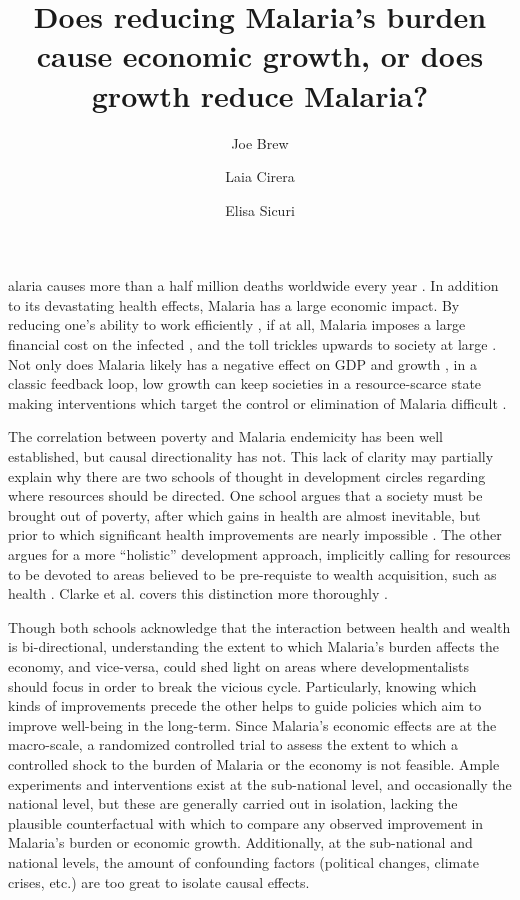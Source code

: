 \documentclass[9pt,twocolumn,twoside,lineno]{pnas-new}
\title{Does reducing Malaria's burden cause economic growth, or does growth reduce Malaria?}
\author[a,b,1]{Joe Brew}
\author[a]{Laia Cirera}
\author[a,c]{Elisa Sicuri}
\affil[a]{Barcelona Institute for Global Health: c/ Rosselló, 132, 5è 2a. 08036, Barcelona, Catalonia}
\affil[b]{VU University Amsterdam: De Boelelaan 1105, 1081 HV Amsterdam, Netherlands}
\affil[c]{Imperial College London: South Kensington Campus, London SW7 2AZ, U.K., UK}
\begin{document}
\maketitle
\thispagestyle{firststyle}


alaria causes more than a half million deaths worldwide every year \cite{White}. In addition to its devastating health effects, Malaria has a large economic impact.  By reducing one’s ability to work efficiently \cite{Nonvignon2016-vt}, if at all, Malaria imposes a large financial cost on the infected \cite{Asenso-Okyere1997-wj} \cite{Ajani2010-dd}, and the toll trickles upwards to society at large \cite{Sachs2002-ig}. Not only does Malaria likely has a negative effect on GDP and growth \cite{McCarthy2000-wl, Orem2012-kr, Hong2011-sa, Sachs2002-ig}, in a classic feedback loop, low growth can keep societies in a resource-scarce state making interventions which target the control or elimination of Malaria difficult \cite{White, Purdy2013-rt, Howard2017-pk, Phillips1998-ky}. 

The correlation between poverty and Malaria endemicity has been well established, but causal directionality has not. This lack of clarity may partially explain why there are two schools of thought in development circles regarding where resources should be directed. One school argues that a society must be brought out of poverty, after which gains in health are almost inevitable, but prior to which significant health improvements are nearly impossible \cite{Musgrove1996-hm}.  The other argues for a more “holistic” development approach, implicitly calling for resources to be devoted to areas believed to be pre-requiste to wealth acquisition, such as health \cite{Storm2008-dd, Sen_undated-gp}.  Clarke et al. covers this distinction more thoroughly \cite{Clarke_JA2016-ik}.

Though both schools acknowledge that the interaction between health and wealth is bi-directional, understanding the extent to which Malaria’s burden affects the economy, and vice-versa, could shed light on areas where developmentalists should focus in order to break the vicious cycle. Particularly, knowing which kinds of improvements precede the other helps to guide policies which aim to improve well-being in the long-term. Since Malaria’s economic effects are at the macro-scale, a randomized controlled trial to assess the extent to which a controlled shock to the burden of Malaria or the economy is not feasible. Ample experiments and interventions exist at the sub-national level, and occasionally the national level, but these are generally carried out in isolation, lacking the plausible counterfactual with which to compare any observed improvement in Malaria’s burden or economic growth. Additionally, at the sub-national and national levels, the amount of confounding factors (political changes, climate crises, etc.) are too great to isolate causal effects. 
\end{document}
